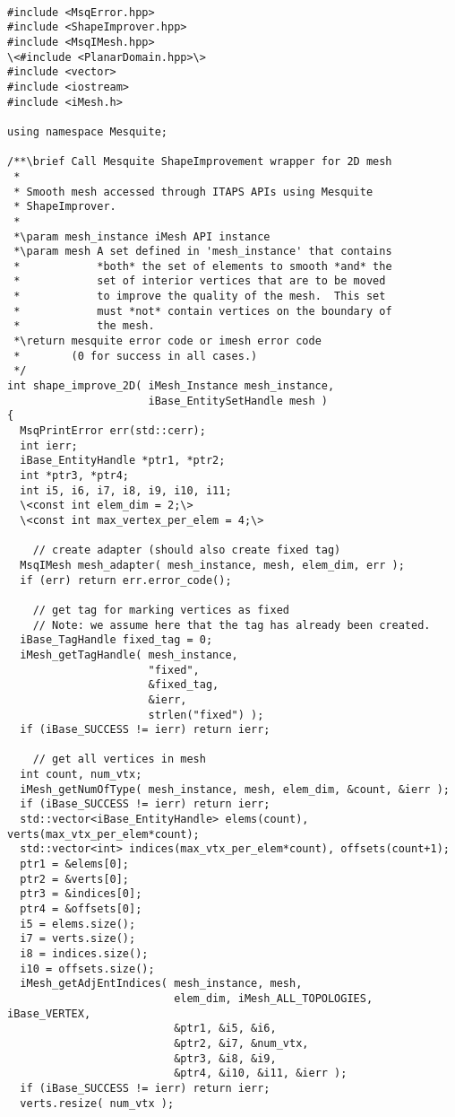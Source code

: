 \begin{lstlisting}

#include <MsqError.hpp>
#include <ShapeImprover.hpp>
#include <MsqIMesh.hpp>
\<#include <PlanarDomain.hpp>\>
#include <vector>
#include <iostream>
#include <iMesh.h>

using namespace Mesquite;

/**\brief Call Mesquite ShapeImprovement wrapper for 2D mesh
 *
 * Smooth mesh accessed through ITAPS APIs using Mesquite
 * ShapeImprover.
 *
 *\param mesh_instance iMesh API instance
 *\param mesh A set defined in 'mesh_instance' that contains
 *            *both* the set of elements to smooth *and* the
 *            set of interior vertices that are to be moved
 *            to improve the quality of the mesh.  This set
 *            must *not* contain vertices on the boundary of
 *            the mesh.
 *\return mesquite error code or imesh error code
 *        (0 for success in all cases.)
 */
int shape_improve_2D( iMesh_Instance mesh_instance,
                      iBase_EntitySetHandle mesh )
{
  MsqPrintError err(std::cerr);
  int ierr;
  iBase_EntityHandle *ptr1, *ptr2;
  int *ptr3, *ptr4;
  int i5, i6, i7, i8, i9, i10, i11;
  \<const int elem_dim = 2;\>
  \<const int max_vertex_per_elem = 4;\>
  
    // create adapter (should also create fixed tag)
  MsqIMesh mesh_adapter( mesh_instance, mesh, elem_dim, err );
  if (err) return err.error_code();

    // get tag for marking vertices as fixed
    // Note: we assume here that the tag has already been created.
  iBase_TagHandle fixed_tag = 0;
  iMesh_getTagHandle( mesh_instance,
                      "fixed",
                      &fixed_tag,
                      &ierr,
                      strlen("fixed") );
  if (iBase_SUCCESS != ierr) return ierr;

    // get all vertices in mesh
  int count, num_vtx;
  iMesh_getNumOfType( mesh_instance, mesh, elem_dim, &count, &ierr );
  if (iBase_SUCCESS != ierr) return ierr;
  std::vector<iBase_EntityHandle> elems(count), verts(max_vtx_per_elem*count);
  std::vector<int> indices(max_vtx_per_elem*count), offsets(count+1);
  ptr1 = &elems[0];
  ptr2 = &verts[0];
  ptr3 = &indices[0];
  ptr4 = &offsets[0];
  i5 = elems.size();
  i7 = verts.size();
  i8 = indices.size();
  i10 = offsets.size();
  iMesh_getAdjEntIndices( mesh_instance, mesh, 
                          elem_dim, iMesh_ALL_TOPOLOGIES, iBase_VERTEX,
                          &ptr1, &i5, &i6,
                          &ptr2, &i7, &num_vtx,
                          &ptr3, &i8, &i9,
                          &ptr4, &i10, &i11, &ierr );
  if (iBase_SUCCESS != ierr) return ierr;
  verts.resize( num_vtx );


\end{lstlisting}

